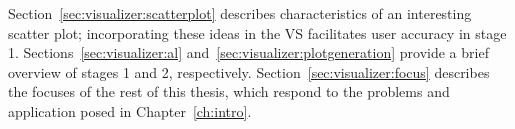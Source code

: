 Section~\ref{sec:visualizer:scatterplot} describes characteristics of an 
interesting scatter plot; incorporating these ideas in the VS facilitates user 
accuracy in stage 1. 
Sections~\ref{sec:visualizer:al} and~\ref{sec:visualizer:plotgeneration} 
provide a brief overview of stages 1 and 2, respectively. 
Section~\ref{sec:visualizer:focus} describes the focuses of the rest of this 
thesis, which respond to the problems and application posed in 
Chapter~\ref{ch:intro}.





